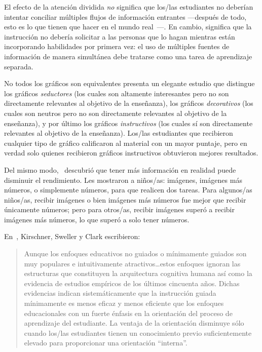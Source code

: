 El efecto de la atención dividida \emph{no} significa
que los/las estudiantes no deberían intentar conciliar múltiples flujos de información entrantes 
—después de todo, esto es lo que tienen que hacer en el mundo real~\cite{Atki2000}—.
En cambio, significa que la instrucción no debería solicitar a las personas
que lo hagan mientras están incorporando habilidades por primera vez:
el uso de múltiples fuentes de información de manera simultánea debe tratarse como una tarea de aprendizaje separada.

\begin{aside}{No todos los gráficos son equivalentes}
  \cite{Sung2012} presenta un elegante estudio que distingue los gráficos \emph{seductores}
  (los cuales son altamente interesantes pero no son directamente relevantes al objetivo de la enseñanza),
  los gráficos \emph{decorativos}
  (los cuales son neutros pero no son directamente relevantes al objetivo de la enseñanza),
  y por último
  los gráficos \emph{instructivos}
  (los cuales sí son directamente relevantes al objetivo de la enseñanza).
  Los/las estudiantes que recibieron cualquier tipo de gráfico calificaron al material
  con un mayor puntaje, pero en verdad solo quienes recibieron gráficos instructivos
  obtuvieron mejores resultados.
  
  Del mismo modo,~\cite{Stam2013,Stam2014} descubrió que
  tener más información en realidad puede disminuir el rendimiento.
  Les mostraron a niños/as: imágenes, imágenes más números, o simplemente números,
  para que realicen dos tareas. 
  Para algunos/as niños/as, recibir imágenes o bien imágenes más números fue mejor que recibir únicamente números;
  pero para otros/as, recibir imágenes superó a recibir imágenes más números,
  lo que superó a solo tener números.
\end{aside}


En~\cite{Kirs2006}, Kirschner, Sweller y Clark escribieron:

\begin{quote}
 
  Aunque los enfoques educativos no guiados o mínimamente guiados son muy    
  populares e intuitivamente atractivos{\ldots}estos enfoques ignoran 
  las estructuras que constituyen la arquitectura cognitiva humana así como
  la evidencia de estudios empíricos de los últimos cincuenta años. Dichas evidencias
  indican sistemáticamente que la instrucción guiada mínimamente es menos eficaz y
  menos eficiente que los enfoques educacionales con un fuerte énfasis
  en la orientación del proceso de aprendizaje del estudiante.
  La ventaja de la orientación disminuye sólo cuando los/las estudiantes
  tienen un conocimiento previo suficientemente elevado para proporcionar una orientación ``interna''.
\end{quote}

